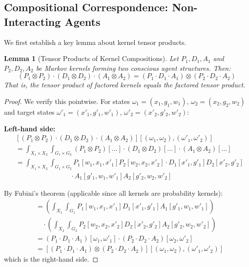 \documentclass[11pt,a4paper]{article}
\theoremstyle{definition}
\theoremstyle{plain}
\newtheorem{lemma}[definition]{Lemma}
\theoremstyle{remark}
\begin{document}
\subsection{Compositional Correspondence: Non-Interacting Agents}

We first establish a key lemma about kernel tensor products.

\begin{lemma}[Tensor Products of Kernel Compositions]\label{lem:tensor-composition}
Let $P_1, D_1, A_1$ and $P_2, D_2, A_2$ be Markov kernels forming two conscious agent structures. Then:
\[
(P_1 \otimes P_2) \cdot (D_1 \otimes D_2) \cdot (A_1 \otimes A_2) = (P_1 \cdot D_1 \cdot A_1) \otimes (P_2 \cdot D_2 \cdot A_2)
\]
That is, the tensor product of factored kernels equals the factored tensor product.
\end{lemma}

\begin{proof}
We verify this pointwise. For states $\omega_1 = (x_1, g_1, w_1)$, $\omega_2 = (x_2, g_2, w_2)$ and target states $\omega'_1 = (x'_1, g'_1, w'_1)$, $\omega'_2 = (x'_2, g'_2, w'_2)$:

\textbf{Left-hand side:}
\begin{align*}
&[(P_1 \otimes P_2) \cdot (D_1 \otimes D_2) \cdot (A_1 \otimes A_2)][(\omega_1, \omega_2), (\omega'_1, \omega'_2)] \\
&= \int_{X_1 \times X_2} \int_{G_1 \times G_2} (P_1 \otimes P_2)[...] \cdot (D_1 \otimes D_2)[...] \cdot (A_1 \otimes A_2)[...] \\
&= \int_{X_1 \times X_2} \int_{G_1 \times G_2} P_1[w_1, x_1, x'_1] P_2[w_2, x_2, x'_2] \cdot D_1[x'_1, g'_1] D_2[x'_2, g'_2] \\
&\qquad\qquad\qquad\qquad \cdot A_1[g'_1, w_1, w'_1] A_2[g'_2, w_2, w'_2]
\end{align*}

By Fubini's theorem (applicable since all kernels are probability kernels):
\begin{align*}
&= \left( \int_{X_1} \int_{G_1} P_1[w_1, x_1, x'_1] D_1[x'_1, g'_1] A_1[g'_1, w_1, w'_1] \right) \\
&\quad \cdot \left( \int_{X_2} \int_{G_2} P_2[w_2, x_2, x'_2] D_2[x'_2, g'_2] A_2[g'_2, w_2, w'_2] \right) \\
&= (P_1 \cdot D_1 \cdot A_1)[\omega_1, \omega'_1] \cdot (P_2 \cdot D_2 \cdot A_2)[\omega_2, \omega'_2] \\
&= [(P_1 \cdot D_1 \cdot A_1) \otimes (P_2 \cdot D_2 \cdot A_2)][(\omega_1, \omega_2), (\omega'_1, \omega'_2)]
\end{align*}
which is the right-hand side.
\end{proof}
\end{document}

